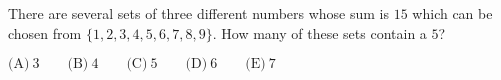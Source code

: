 

There are several sets of three different numbers whose sum is $15$ which can be chosen from $\{ 1,2,3,4,5,6,7,8,9 \}$. How many of these sets contain a $5$?

$\text{(A)}\ 3 \qquad \text{(B)}\ 4 \qquad \text{(C)}\ 5 \qquad \text{(D)}\ 6 \qquad \text{(E)}\ 7$
